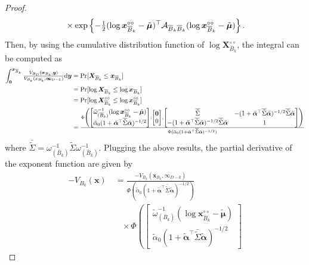 \documentclass[lineno]{biometrika}
\begin{document}
\begin{proof}
\begin{align*}
&\quad \times \exp\left\{-{\textstyle{1\over2}} (\log \bm x_{{\overline{B}}_k}^{\circ\circ}-\tilde{\bm\mu})^\top {\mathcal A}_{{\overline{B}}_k {\overline{B}}_k} (\log \bm x_{{\overline{B}}_k}^{\circ\circ}-\tilde{\bm\mu})\right\}. 
\end{align*}
Then, by using the cumulative distribution function of $\log\bm X_{\bar B_k}^{\circ\circ}$, the integral can be computed as
\begin{align*}
   \int_{\bm 0}^{\bm x_{{\overline{B}}_k}}{\textstyle{V_{B_D}(\bm x_{B_k},\bm y)\over V_{B_k}(x_{B_k},\bm\infty_{D-k})}} \text d \bm y 
   &= {\rm Pr}[\bm X_{{\overline{B}}_k} \leq \bm x_{{\overline{B}}_k}] \\
& = {\rm Pr}[\log\bm X_{{\overline{B}}_k} \leq \log\bm x_{{\overline{B}}_k}]\\
& = {\rm Pr}[\log\bm X_{{\overline{B}}_k}^{\circ\circ} \leq \log\bm x_{{\overline{B}}_k}^{\circ\circ}] \\
& =  {\textstyle{\Phi\left(
\begin{bmatrix} \tilde\omega^{-1}_{({\overline{B}}_k)}(\log \bm x_{{\overline{B}}_k}^{\circ\circ} - \tilde{\bm\mu})  \\\tilde\alpha_0(1+\tilde{\bm\alpha}^\top{\overline{\tilde\Sigma}}\tilde{\bm\alpha})^{-1/2}
\end{bmatrix};
\begin{bmatrix}
\bm 0 \\ 0
\end{bmatrix},
\begin{bmatrix}
	{\overline{\tilde\Sigma}} & -(1+\tilde{\bm\alpha}^\top{\overline{\tilde\Sigma}}\tilde{\bm\alpha})^{-1/2}{\overline{\tilde\Sigma}}\tilde{\bm\alpha} \\
-(1+\tilde{\bm\alpha}^\top{\overline{\tilde\Sigma}}\tilde{\bm\alpha})^{-1/2}{\overline{\tilde\Sigma}}\tilde{\bm\alpha} &	1
\end{bmatrix} 
\right)\over\Phi(\tilde\alpha_0(1+\tilde{\bm\alpha}^\top{\overline{\tilde\Sigma}}\tilde{\bm\alpha})^{-1/2})}}   
\end{align*}
where $\bar{\tilde\Sigma} = \omega_{(\bar B_k)}^{-1}\tilde\Sigma\omega_{(\bar B_k)}^{-1}$. 
Plugging the above results, the partial derivative of the exponent function are given by
\begin{align*}
   -V_{B_k}(\bm x) &\ =  
   \frac{-V_{B_k}(\bm x_{B_k},\bm \infty_{D-k})}{\Phi(\tilde\alpha_0(1+\tilde{\bm\alpha}^\top\bar{\tilde\Sigma}\tilde{\bm\alpha})^{-1/2})} \\
   & \quad \times
   \Phi\left(
   \begin{bmatrix} \tilde\omega^{-1}_{(\bar B_k)}(\log \bm x_{\bar B_k}^{\circ\circ} - \tilde{\bm\mu})  \\
\tilde\alpha_0(1+\tilde{\bm\alpha}^\top\bar{\tilde\Sigma}\tilde{\bm\alpha})^{-1/2}

\end{bmatrix}
\end{align*}
\end{proof}
\end{document}
